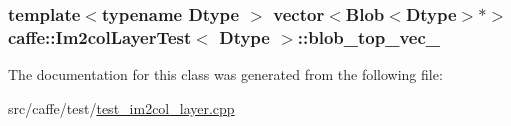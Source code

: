 \hypertarget{classcaffe_1_1_im2col_layer_test_ac2f2ec2988cd9149e50dd366957d830e}{
\subsubsection[{blob\+\_\+top\+\_\+vec\+\_\+}]{\setlength{\rightskip}{0pt plus 5cm}template$<$typename Dtype $>$ vector$<${\bf Blob}$<$Dtype$>$$\ast$$>$ {\bf caffe\+::\+Im2col\+Layer\+Test}$<$ Dtype $>$\+::blob\+\_\+top\+\_\+vec\+\_\+\hspace{0.3cm}{\ttfamily [protected]}}}\label{classcaffe_1_1_im2col_layer_test_ac2f2ec2988cd9149e50dd366957d830e}


The documentation for this class was generated from the following file\+:\begin{DoxyCompactItemize}
\item 
src/caffe/test/\hyperlink{test__im2col__layer_8cpp}{test\+\_\+im2col\+\_\+layer.\+cpp}\end{DoxyCompactItemize}

